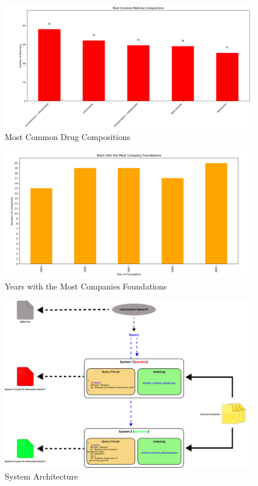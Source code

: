 \documentclass[sigconf]{acmart}
\begin{document}
\begin{figure}[H]
	\centering
	\includegraphics[width=\linewidth]{graphic6.png}
	\caption{Most Common Drug Compositions}
	\label{fig:commonDrugCompositions}
  \end{figure}

\begin{figure}[H]
	\centering
	\includegraphics[width=\linewidth]{graphic7.png}
	\caption{Years with the Most Companies Foundations}
	\label{fig:companyYears}
  \end{figure}

\begin{figure}[H]
	\centering
	\includegraphics[width=\linewidth]{system_arch.png}
	\caption{System Architecture}
	\label{fig:sysArchitecture}
  \end{figure}
\end{document}
